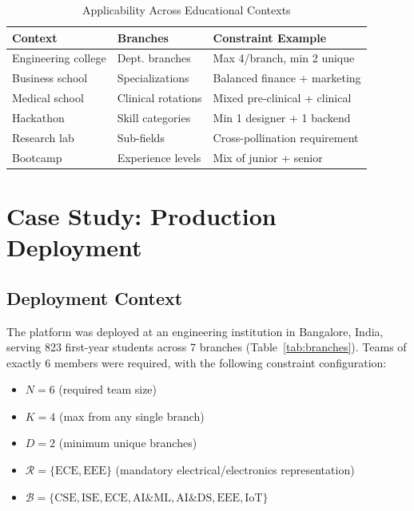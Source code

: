 \documentclass[conference]{IEEEtran}
\begin{document}
\begin{table}[htbp]
\centering
\caption{Applicability Across Educational Contexts}
\label{tab:applicability}
\footnotesize
\renewcommand{\arraystretch}{1.15}
\begin{tabular}{@{}p{2cm}p{2cm}p{2.6cm}@{}}
\toprule
\textbf{Context} & \textbf{Branches} & \textbf{Constraint Example} \\
\midrule
Engineering college & Dept. branches & Max 4/branch, min 2 unique \\
Business school & Specializations & Balanced finance + marketing \\
Medical school & Clinical rotations & Mixed pre-clinical + clinical \\
Hackathon & Skill categories & Min 1 designer + 1 backend \\
Research lab & Sub-fields & Cross-pollination requirement \\
Bootcamp & Experience levels & Mix of junior + senior \\
\bottomrule
\end{tabular}
\end{table}

\section{Case Study: Production Deployment}
\label{sec:casestudy}

\subsection{Deployment Context}

The platform was deployed at an engineering institution in Bangalore, India, serving 823 first-year students across 7 branches (Table~\ref{tab:branches}). Teams of exactly 6 members were required, with the following constraint configuration:

\begin{itemize}[noitemsep,topsep=3pt]
    \item $N = 6$ (required team size)
    \item $K = 4$ (max from any single branch)
    \item $D = 2$ (minimum unique branches)
    \item $\mathcal{R} = \{\text{ECE}, \text{EEE}\}$ (mandatory electrical/electronics representation)
    \item $\mathcal{B} = \{\text{CSE}, \text{ISE}, \text{ECE}, \text{AI\&ML}, \text{AI\&DS}, \text{EEE}, \text{IoT}\}$
\end{itemize}
\end{document}
